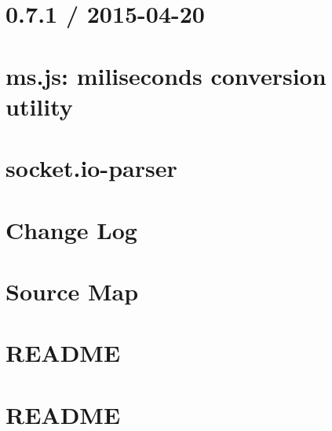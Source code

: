 \documentclass[twoside]{book}
\newcommand{\+}{\discretionary{\mbox{\scriptsize$\hookleftarrow$}}{}{}}
\begin{document}
\chapter{0.7.1 / 2015-\/04-\/20}
\label{md_app_web_node_modules_socket_8io-parser_node_modules_ms__history}

\chapter{ms.\+js\+: miliseconds conversion utility}
\label{md_app_web_node_modules_socket_8io-parser_node_modules_ms__r_e_a_d_m_e}

\chapter{socket.\+io-\/parser}
\label{md_app_web_node_modules_socket_8io-parser__readme}

\chapter{Change Log}
\label{md_app_web_node_modules_source-map__c_h_a_n_g_e_l_o_g}

\chapter{Source Map}
\label{md_app_web_node_modules_source-map__r_e_a_d_m_e}

\chapter{R\+E\+A\+D\+ME}
\label{md_app_web_node_modules_spdx-correct__r_e_a_d_m_e}

\chapter{R\+E\+A\+D\+ME}
\label{md_app_web_node_modules_spdx-expression-parse__r_e_a_d_m_e}

\end{document}
